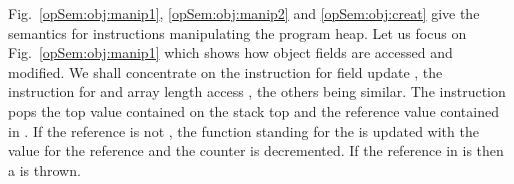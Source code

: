\begin{figure}[ht!]
\end{figure}
Fig.\ \ref{opSem:obj:manip1},  \ref{opSem:obj:manip2} and \ref{opSem:obj:creat}  give the semantics for instructions manipulating the program heap.
Let us focus on Fig.\ \ref{opSem:obj:manip1} which shows how object fields are accessed and modified. 
We shall concentrate on the instruction for field update \putfield{}, the instruction for  \arrstore{} and array length access \arraylength, the others being similar. 
The instruction \putfield{} pops the top value contained on the stack top \stackOnlyParam{\counterOnly} 
and the reference value contained in . If the reference
   is not \Mynull,  
the function  standing for the	\fieldd{}   is updated with the value\stackOnlyParam{\counterOnly} for the reference    and
 the counter \counterOnly{} is decremented. If the reference in  is \Mynull{} then a \NullPointerExc{} is thrown. 

